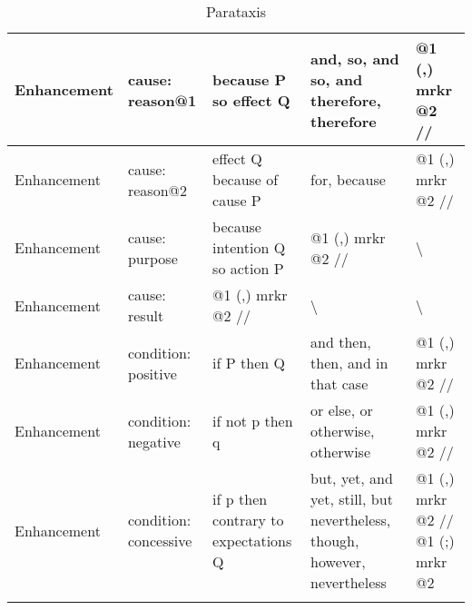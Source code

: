 \begin{landscape}
\begin{longtable}{|l|l|p{3cm}|p{5cm}|p{5cm}|}
			Enhancement & cause: reason@1        & because P so effect Q                & and, so, and so, and therefore, therefore                                              & @1 (,) mrkr @2 //                                                                       \\ \hline
			Enhancement & cause: reason@2        & effect Q because of cause P          & for, because                                                                           & @1 (,) mrkr @2 //                                                                       \\ \hline
			Enhancement & cause: purpose         & because intention Q so action P      & @1 (,) mrkr @2 //                                                                      & \textbackslash                                                                          \\ \hline
			Enhancement & cause: result          & @1 (,) mrkr @2 //                    & \textbackslash                                                                         & \textbackslash                                                                          \\ \hline
			Enhancement & condition: positive    & if P then Q                          & and then, then, and in that case                                                       & @1 (,) mrkr @2 //                                                                       \\ \hline
			Enhancement & condition: negative    & if not p then q                      & or else, or otherwise, otherwise                                                       & @1 (,) mrkr @2 //                                                                       \\ \hline
			Enhancement & condition: concessive  & if p then contrary to expectations Q & but, yet, and yet, still, but nevertheless, though, however, nevertheless              & @1 (,) mrkr @2 // @1 (;) mrkr @2                                                        \\ \hline
			
			\caption{Parataxis}
			\label{tab:parataxis}
		\end{longtable}


\end{landscape}
